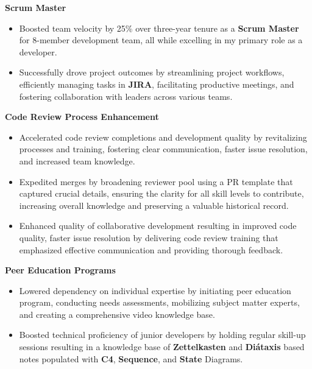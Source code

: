 \documentclass[a4paper]{article}
\newcommand{\forceindent}{\leavevmode{\parindent=1em\indent}}
\begin{document}
\vspace{-1mm}
\forceindent \textbf{Scrum Master} \\
\vspace{-1mm}
\begin{itemize}
	\item Boosted team velocity by 25\% over three-year tenure as a \textbf{Scrum Master} for 8-member development team, all while excelling in my primary role as a developer.
	\item Successfully drove project outcomes by streamlining project workflows, efficiently managing tasks in \textbf{JIRA}, facilitating productive meetings, and fostering collaboration with leaders across various teams.
\end{itemize}
\vspace{-1mm}
\forceindent \textbf{Code Review Process Enhancement} \\
\vspace{-1mm}
\begin{itemize}
	\item Accelerated code review completions and development quality by revitalizing processes and training, fostering clear communication, faster issue resolution, and increased team knowledge.
	\item Expedited merges by broadening reviewer pool using a PR template that captured crucial details, ensuring the clarity for all skill levels to contribute, increasing overall knowledge and preserving a valuable historical record.
	\item Enhanced quality of collaborative development resulting in improved code quality, faster issue resolution by delivering code review training that emphasized effective communication and providing thorough feedback.
\end{itemize}
\vspace{-1mm}
\forceindent \textbf{Peer Education Programs} \\
\vspace{-1mm}
\begin{itemize}
	\item Lowered dependency on individual expertise by initiating peer education program, conducting needs assessments, mobilizing subject matter experts, and creating a comprehensive video knowledge base.
	\item Boosted technical proficiency of junior developers by holding regular skill-up sessions resulting in a knowledge base of \textbf{Zettelkasten} and \textbf{Diátaxis} based notes populated with \textbf{C4}, \textbf{Sequence}, and \textbf{State} Diagrams.
\end{itemize}
\end{document}
